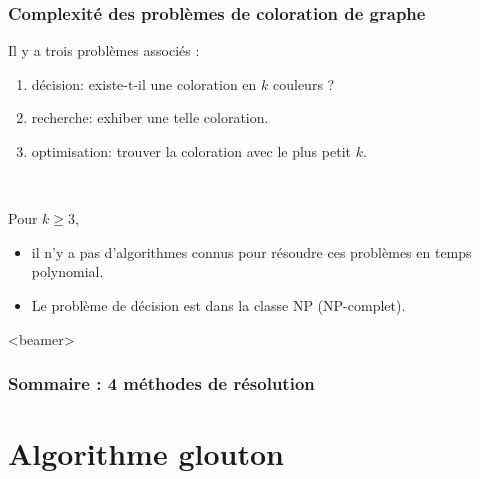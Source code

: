 \documentclass{beamer}
\begin{document}
\begin{frame}
  \frametitle{Complexité des problèmes de coloration de graphe}


  Il y a trois problèmes associés :
  \begin{enumerate}
    \item décision:
      existe-t-il une coloration en $k$ couleurs ?
    \item recherche:
      exhiber une telle coloration.
    \item optimisation:
      trouver la coloration avec le plus petit $k$. %
  \end{enumerate}

  ~
  
  Pour $k \geq 3$,
  \begin{itemize}
  \item il n'y a pas d'algorithmes connus pour
    résoudre ces problèmes en temps polynomial.
  \item Le problème de décision est dans la classe NP
    (NP-complet).
  \end{itemize}
\end{frame}


\begin{frame}<beamer>
  \frametitle{Sommaire : 4 méthodes de résolution}
  \tableofcontents[sections={2,3,5,6}]
\end{frame}

\section{Algorithme glouton}
\end{document}
